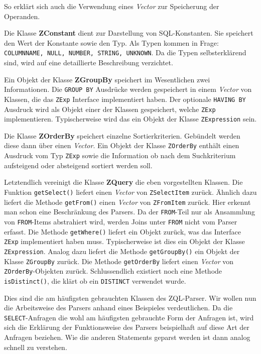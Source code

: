 So erklärt sich auch die Verwendung eines \textit{Vector} zur Speicherung der Operanden.

Die Klasse \textbf{ZConstant} dient zur Darstellung von SQL-Konstanten. Sie speichert den Wert der Konstante sowie den Typ. Als Typen kommen in Frage: \verb|COLUMNNAME, NULL, NUMBER, STRING, UNKNOWN|. Da die Typen selbsterklärend sind, wird auf eine detaillierte Beschreibung verzichtet.

Ein Objekt der Klasse \textbf{ZGroupBy} speichert im Wesentlichen zwei Informationen. Die \verb|GROUP BY| Ausdrücke werden gespeichert in einem \textit{Vector} von Klassen, die das \verb|ZExp| Interface implementiert haben. Der optionale \verb|HAVING BY| Ausdruck wird als Objekt einer der Klassen gespeichert, welche \verb|ZExp| implementieren. Typischerweise wird das ein Objekt der Klasse \verb|ZExpression| sein.

Die Klasse \textbf{ZOrderBy} speichert einzelne Sortierkriterien. Gebündelt werden diese dann über einen \textit{Vector}. Ein Objekt der Klasse \verb|ZOrderBy| enthält einen Ausdruck vom Typ \verb|ZExp| sowie die Information ob nach dem Suchkriterium aufsteigend oder absteigend sortiert werden soll.

Letztendlich vereinigt die Klasse \textbf{ZQuery} die eben vorgestellten Klassen. Die Funktion \verb|getSelect()| liefert einen \textit{Vector} von \verb|ZSelectItem| zurück. Ähnlich dazu liefert die Methode \verb|getFrom()| einen \textit{Vector} von \verb|ZFromItem| zurück. Hier erkennt man schon eine Beschränkung des Parsers. Da der \verb|FROM|-Teil nur als Ansammlung von \verb|FROM|-Items abstrahiert wird, werden Joins unter \verb|FROM| nicht vom Parser erfasst. Die Methode \verb|getWhere()| liefert ein Objekt zurück, was das Interface \verb|ZExp| implementiert haben muss. Typischerweise ist dies ein Objekt der Klasse \verb|ZExpression|. Analog dazu liefert die Methode \verb|getGroupBy()| ein Objekt der Klasse \verb|ZGroupBy| zurück. Die Methode \verb|getOrderBy| liefert einen \textit{Vector} von \verb|ZOrderBy|-Objekten zurück.
Schlussendlich existiert noch eine Methode \verb|isDistinct()|, die klärt ob ein \verb|DISTINCT| verwendet wurde.

Dies sind die am häufigsten gebrauchten Klassen des ZQL-Parser. Wir wollen nun die Arbeitsweise des Parsers anhand eines Beispieles verdeutlichen. Da die \verb|SELECT|-Anfragen die wohl am häufigsten gebrauchte Form der Anfragen ist, wird sich die Erklärung der Funktionsweise des Parsers beispielhaft auf diese Art der Anfragen beziehen. Wie die anderen Statements geparst werden ist dann analog schnell zu verstehen.


